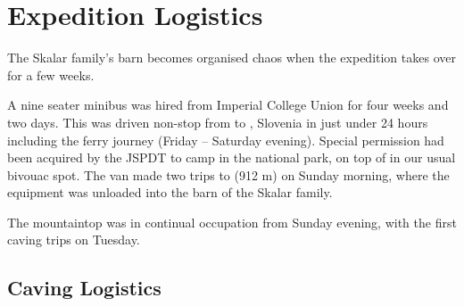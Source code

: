 \section{Expedition Logistics}


    \begin{marginfigure}
\checkoddpage \ifoddpage \forcerectofloat \else \forceversofloat \fi
\centering
 \caption{The Skalar family's barn becomes organised chaos when the expedition takes over for a few weeks. }
 \label{Skalar barn}
\end{marginfigure}

A nine seater minibus was hired from Imperial College Union for four weeks and two days. 
This was driven
non-stop from  to , Slovenia in just under 24 hours
including the ferry journey (Friday -- Saturday evening). Special permission
had been acquired by the JSPDT to camp in the national park, on top of 
in our usual bivouac spot. The van made two trips to  (912 m) on
Sunday morning, where the equipment was unloaded into the barn of the Skalar
family. 

The mountaintop was in continual occupation from Sunday evening, with the first
caving trips on Tuesday.

\subsection{Caving Logistics}

